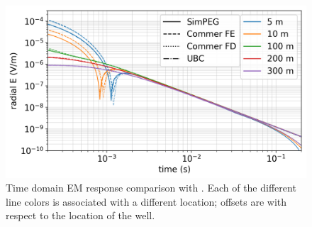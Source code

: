 \begin{figure}[htb]
    \begin{center}
    \includegraphics[width=0.8\columnwidth]{figures/casing_software/commer_results.png}
    \end{center}
\caption{Time domain EM response comparison with \citep{Commer2015}. Each of the different line colors is associated with a different location; offsets are with respect to the location of the well.}
\label{fig:commer_results}
\end{figure}
